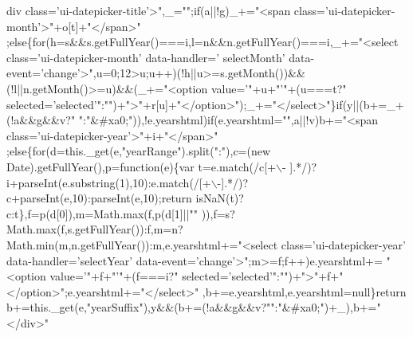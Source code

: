 \begin{DoxyCode}
      div \textcolor{keyword}{class}=\textcolor{stringliteral}{'ui-datepicker-title'}>\textcolor{stringliteral}{",\_="}\textcolor{stringliteral}{";if(a||!g)\_+="}<span \textcolor{keyword}{class}=\textcolor{stringliteral}{'ui-datepicker-month'}>\textcolor{stringliteral}{"+o[t]+"}</span>\textcolor{stringliteral}{"
      ;else\{for(h=s&&s.getFullYear()===i,l=n&&n.getFullYear()===i,\_+="}<select \textcolor{keyword}{class}=\textcolor{stringliteral}{'ui-datepicker-month'} data-handler=\textcolor{stringliteral}{'
      selectMonth'} data-\textcolor{keyword}{event}=\textcolor{stringliteral}{'change'}>\textcolor{stringliteral}{",u=0;12>u;u++)(!h||u>=s.getMonth())&&(!l||n.getMonth()>=u)&&(\_+="}<option 
      value=\textcolor{stringliteral}{'"+u+"'}\textcolor{stringliteral}{"+(u===t?"} selected=\textcolor{stringliteral}{'selected'}\textcolor{stringliteral}{":"}\textcolor{stringliteral}{")+"}>\textcolor{stringliteral}{"+r[u]+"}</option>\textcolor{stringliteral}{");\_+="}</select>\textcolor{stringliteral}{"\}if(y||(b+=\_+(!a&&g&&v?"}\textcolor{stringliteral}{
      ":"}&#xa0;\textcolor{stringliteral}{")),!e.yearshtml)if(e.yearshtml="}\textcolor{stringliteral}{",a||!v)b+="}<span \textcolor{keyword}{class}=\textcolor{stringliteral}{'ui-datepicker-year'}>\textcolor{stringliteral}{"+i+"}</span>\textcolor{stringliteral}{"
      ;else\{for(d=this.\_get(e,"}yearRange\textcolor{stringliteral}{").split("}:\textcolor{stringliteral}{"),c=(new Date).getFullYear(),p=function(e)\{var t=e.match(/c[+\(\backslash\)-
      ].*/)?i+parseInt(e.substring(1),10):e.match(/[+\(\backslash\)-].*/)?c+parseInt(e,10):parseInt(e,10);return
       isNaN(t)?c:t\},f=p(d[0]),m=Math.max(f,p(d[1]||"}\textcolor{stringliteral}{"
      )),f=s?Math.max(f,s.getFullYear()):f,m=n?Math.min(m,n.getFullYear()):m,e.yearshtml+="}<select \textcolor{keyword}{class}=\textcolor{stringliteral}{'ui-datepicker-year'} data-handler=\textcolor{stringliteral}{'selectYear'} data-\textcolor{keyword}{event}=\textcolor{stringliteral}{'change'}>\textcolor{stringliteral}{";m>=f;f++)e.yearshtml+=
      "}<option value=\textcolor{stringliteral}{'"+f+"'}\textcolor{stringliteral}{"+(f===i?"} selected=\textcolor{stringliteral}{'selected'}\textcolor{stringliteral}{":"}\textcolor{stringliteral}{")+"}>\textcolor{stringliteral}{"+f+"}</option>\textcolor{stringliteral}{";e.yearshtml+="}</select>\textcolor{stringliteral}{"
      ,b+=e.yearshtml,e.yearshtml=null\}return b+=this.\_get(e,"}yearSuffix\textcolor{stringliteral}{"),y&&(b+=(!a&&g&&v?"}\textcolor{stringliteral}{":"}&#xa0;\textcolor{stringliteral}{")+\_),b+="}</div>\textcolor{stringliteral}{"
}
\end{DoxyCode}
